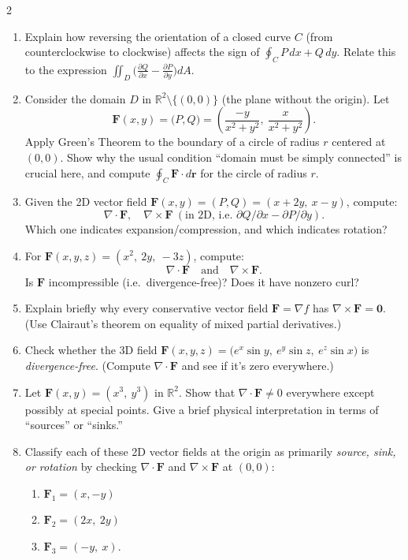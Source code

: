 \begin{multicols}{2}
\begin{enumerate}
\item 
Explain how reversing the orientation of a closed curve \(C\) (from counterclockwise to clockwise) affects the sign of
\(\displaystyle \oint_C P\,dx + Q\,dy\).
Relate this to the expression
\(\displaystyle \iint_D \bigl(\tfrac{\partial Q}{\partial x} - \tfrac{\partial P}{\partial y}\bigr)dA\).

\item \enspace
Consider the domain \(D\) in \(\mathbb{R}^2\setminus\{(0,0)\}\) (the plane without the origin). Let
\[
\mathbf{F}(x,y) = \bigl(P,Q\bigr) = \left(\frac{-y}{x^2+y^2},\ \frac{x}{x^2+y^2}\right).
\]
Apply Green’s Theorem to the boundary of a circle of radius \(r\) centered at \((0,0)\). Show why the usual condition “domain must be simply connected” is crucial here, and compute 
\(\displaystyle \oint_C \mathbf{F}\cdot d\mathbf{r}\)
for the circle of radius \(r\). 

\item 
Given the 2D vector field $\mathbf{F}(x,y) = (P,Q) = (x+2y,\ x-y)$, compute:
\[
\nabla \cdot \mathbf{F}, 
\quad
\nabla \times \mathbf{F}
\ (\text{in 2D, i.e.\ } \partial Q/\partial x - \partial P/\partial y).
\]
Which one indicates expansion/compression, and which indicates rotation?

\item 
For $\mathbf{F}(x,y,z) = (x^2,\ 2y,\ -3z)$, compute:
\[
\nabla \cdot \mathbf{F}
\quad \text{and} \quad
\nabla \times \mathbf{F}.
\]
Is $\mathbf{F}$ incompressible (i.e.\ divergence-free)? Does it have nonzero curl?

\item \enspace
Explain briefly why every conservative vector field $\mathbf{F} = \nabla f$ has $\nabla \times \mathbf{F} = \mathbf{0}$. (Use Clairaut’s theorem on equality of mixed partial derivatives.)

\item \enspace
Check whether the 3D field $\mathbf{F}(x,y,z) = \bigl( e^x \sin y,\ e^y \sin z,\ e^z \sin x \bigr)$ is \emph{divergence-free}. (Compute $\nabla \cdot \mathbf{F}$ and see if it’s zero everywhere.)

\item \enspace
Let $\mathbf{F}(x,y) = (x^3,\ y^3)$ in $\mathbb{R}^2$.  Show that $\nabla \cdot \mathbf{F} \neq 0$ everywhere except possibly at special points. Give a brief physical interpretation in terms of ``sources'' or ``sinks.'' 

\item \enspace
Classify each of these 2D vector fields at the origin as primarily \emph{source, sink, or rotation} by checking $\nabla \cdot \mathbf{F}$ and $\nabla \times \mathbf{F}$ at $(0,0)$:
\begin{enumerate}
\item $\mathbf{F}_1 = (x,-y)$
\item $\mathbf{F}_2 = (2x,\ 2y)$
\item $\mathbf{F}_3 = (-y,\ x).$
\end{enumerate}


\end{enumerate}
\end{multicols}
